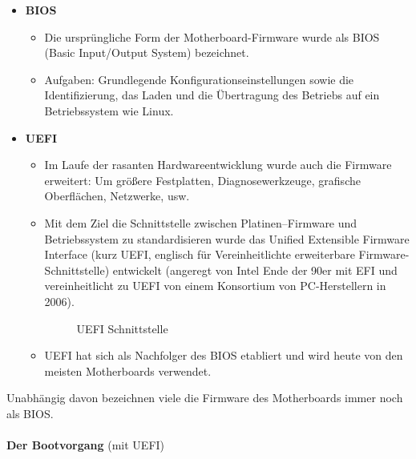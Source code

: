\begin{itemize}
	\item \textbf{BIOS}
\begin{itemize}
	\item Die ursprüngliche Form der Motherboard-Firmware wurde als BIOS (Basic Input/Output System) bezeichnet.
	\item Aufgaben: Grundlegende Konfigurationseinstellungen sowie die Identifizierung, das Laden und die Übertragung des Betriebs auf ein Betriebssystem wie Linux. 
\end{itemize}
\item \textbf{UEFI}
\begin{itemize}
	\item Im Laufe der rasanten Hardwareentwicklung wurde auch die Firmware erweitert: Um größere Festplatten, Diagnosewerkzeuge, grafische Oberflächen, Netzwerke, usw.
	\item Mit dem Ziel die Schnittstelle zwischen Platinen--Firmware und Betriebssystem zu standardisieren wurde das Unified Extensible Firmware Interface (kurz UEFI, englisch für Vereinheitlichte erweiterbare Firmware-Schnittstelle) entwickelt (angeregt von Intel Ende der 90er mit EFI und vereinheitlicht zu UEFI von einem Konsortium von PC-Herstellern in 2006).
	\begin{figure}[h!]
		\centering
		\caption[UEFI als Schnittstelle]{UEFI Schnittstelle}
		\label{fig:uefiinterface}
	\end{figure}
	\item UEFI hat sich als Nachfolger des BIOS etabliert und wird heute von den meisten Motherboards verwendet.
\end{itemize}
\end{itemize}
Unabhängig davon bezeichnen viele die Firmware des Motherboards immer noch als BIOS.
~\\~\\
\textbf{Der Bootvorgang} (mit UEFI)
